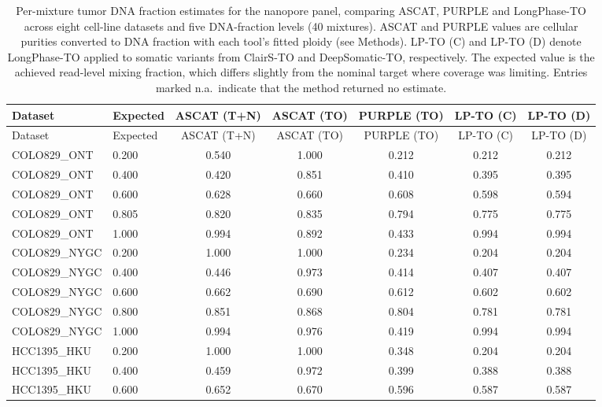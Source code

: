 \documentclass[pdflatex,sn-nature]{sn-jnl}
\begin{document}
\begin{small}
\begin{longtable}{@{}llccccc@{}}
  \caption[Tumor DNA fraction estimates for the nanopore panel]%
  {Per-mixture tumor DNA fraction estimates for the nanopore panel, comparing ASCAT, PURPLE and
  LongPhase-TO across eight cell-line datasets and five DNA-fraction levels (40 mixtures). ASCAT and
  PURPLE values are cellular purities converted to DNA fraction with each tool's fitted ploidy (see Methods).
  LP-TO (C) and LP-TO (D) denote LongPhase-TO applied to somatic variants from ClairS-TO and DeepSomatic-TO, respectively. The expected value is the achieved read-level mixing fraction, which differs slightly from the nominal target where coverage was limiting. Entries marked n.a.\ indicate that the method returned no estimate.}
  \label{tab:tumor-purity}\\
  \toprule
  Dataset & Expected & ASCAT (T+N) & ASCAT (TO) & PURPLE (TO) & LP-TO (C) & LP-TO (D) \\
  \midrule
  \endfirsthead
  \toprule
  Dataset & Expected & ASCAT (T+N) & ASCAT (TO) & PURPLE (TO) & LP-TO (C) & LP-TO (D) \\
  \midrule
  \endhead
  \bottomrule
  \endlastfoot
  COLO829\_ONT & 0.200 & 0.540 & 1.000 & 0.212 & 0.212 & 0.212 \\
  COLO829\_ONT & 0.400 & 0.420 & 0.851 & 0.410 & 0.395 & 0.395 \\
  COLO829\_ONT & 0.600 & 0.628 & 0.660 & 0.608 & 0.598 & 0.594 \\
  COLO829\_ONT & 0.805 & 0.820 & 0.835 & 0.794 & 0.775 & 0.775 \\
  COLO829\_ONT & 1.000 & 0.994 & 0.892 & 0.433 & 0.994 & 0.994 \\
  \addlinespace
  COLO829\_NYGC & 0.200 & 1.000 & 1.000 & 0.234 & 0.204 & 0.204 \\
  COLO829\_NYGC & 0.400 & 0.446 & 0.973 & 0.414 & 0.407 & 0.407 \\
  COLO829\_NYGC & 0.600 & 0.662 & 0.690 & 0.612 & 0.602 & 0.602 \\
  COLO829\_NYGC & 0.800 & 0.851 & 0.868 & 0.804 & 0.781 & 0.781 \\
  COLO829\_NYGC & 1.000 & 0.994 & 0.976 & 0.419 & 0.994 & 0.994 \\
  \addlinespace
  HCC1395\_HKU & 0.200 & 1.000 & 1.000 & 0.348 & 0.204 & 0.204 \\
  HCC1395\_HKU & 0.400 & 0.459 & 0.972 & 0.399 & 0.388 & 0.388 \\
  HCC1395\_HKU & 0.600 & 0.652 & 0.670 & 0.596 & 0.587 & 0.587 \\

\end{longtable}
\end{small}
\end{document}

